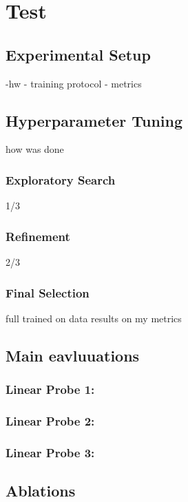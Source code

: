 

\chapter{Test}
\label{cap:test}


\section{Experimental Setup}

-hw
- training protocol
- metrics


\section{Hyperparameter Tuning}
how was done

\subsection{Exploratory Search}
1/3

\subsection{Refinement}
2/3

\subsection{Final Selection}
full trained on data
results on my metrics

\section{Main eavluuations}
\subsection{Linear Probe 1:}


\subsection{Linear Probe 2:}


\subsection{Linear Probe 3:}


\section{Ablations}

